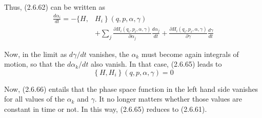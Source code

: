 \documentclass{article}
\begin{document}
Thus, (2.6.62) can be written as
$$
\begin{align*}
\frac{d \alpha_{i}}{d t}=-\{H, & \left.H_{i}\right\}(q, p, \alpha, \gamma)  \tag{2.6.65}\\
& +\sum_{j} \frac{\partial H_{i}\left(q_{i}, p_{i}, \alpha, \gamma\right)}{\partial \alpha_{j}} \frac{d \alpha_{j}}{d t}+\frac{\partial H_{i}\left(q_{i}, p_{i}, \alpha, \gamma\right)}{\partial \gamma} \frac{d \gamma}{d t}
\end{align*}
$$

Now, in the limit as $d \gamma / d t$ vanishes, the $\alpha_{k}$ must become again integrals of motion, so that the $d \alpha_{k} / d t$ also vanish. In that case, (2.6.65) leads to
$$
\begin{equation*}
\left\{H, H_{i}\right\}(q, p, \alpha, \gamma)=0 \tag{2.6.66}
\end{equation*}
$$

Now, (2.6.66) entails that the phase space function in the left hand side vanishes for all values of the $\alpha_{k}$ and $\gamma$. It no longer matters whether those values are constant in time or not. In this way, (2.6.65) reduces to (2.6.61).
\end{document}
